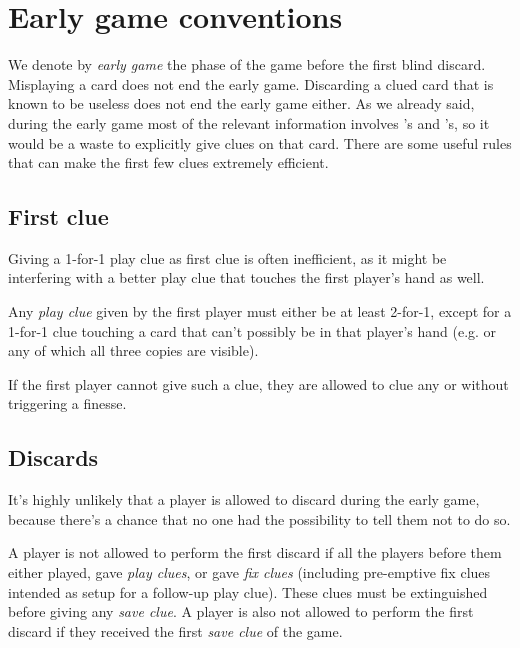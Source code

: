 
\section{Early game conventions}
\label{sec:early-game}

We denote by \emph{early game} the phase of the game before the first blind discard. Misplaying a card does not end the early game. Discarding a clued card that is known to be useless does not end the early game either. As we already said, during the early game most of the relevant information involves 's and 's, so it would be a waste to explicitly give clues on that card. There are some useful rules that can make the first few clues extremely efficient.

\subsection{First clue}

Giving a 1-for-1 play clue as first clue is often inefficient, as it might be interfering with a better play clue that touches the first player's hand as well.

\begin{convention}
	Any \emph{play clue} given by the first player must either be at least 2-for-1, except for a 1-for-1 clue touching a card that can't possibly be in that player's hand (e.g.  or any  of which all three copies are visible).
\end{convention}

If the first player cannot give such a clue, they are allowed to clue any  or  without triggering a finesse.

\subsection{Discards}

It's highly unlikely that a player is allowed to discard during the early game, because there's a chance that no one had the possibility to tell them not to do so.

\begin{convention}
	A player is not allowed to perform the first discard if all the players before them either played, gave \emph{play clues}, or gave \emph{fix clues} (including pre-emptive fix clues intended as setup for a follow-up play clue). These clues must be extinguished before giving any \emph{save clue}. A player is also not allowed to perform the first discard if they received the first \emph{save clue} of the game.
\end{convention}

